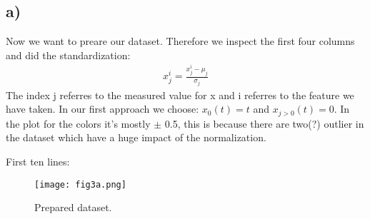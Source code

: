 \subsection{a)}
Now we want to preare our dataset. Therefore we inspect the first four columns and did the standardization:
\begin{align}
    x_j^{i} = \frac{x_j^{i} - \mu_j}{\sigma_j}
\end{align}
The index j referres to the measured value for x and i referres to the feature we have taken. In our first approach we choose: $x_0(t) = t$ and $x_{j>0}(t) = 0$. In the plot for the colors it's mostly $\pm$ 0.5, this is because there are two(?) outlier in the dataset which have a huge impact of the normalization.


First ten lines:



\begin{figure}[h!]
    \centering
    \texttt{[image: fig3a.png]}
    \caption{Prepared dataset.}
\end{figure}




